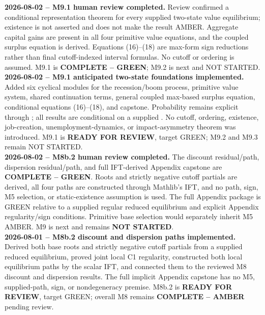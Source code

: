 \documentclass[10pt]{article}
\newcommand{\code}[1]{\texttt{\detokenize{#1}}}
\begin{document}
\textbf{2026-08-02 -- M9.1 human review completed.}
Review confirmed a conditional representation theorem for every supplied
two-state value equilibrium; existence is not asserted and does not make the
result AMBER. Aggregate capital gains are present in all four primitive value
equations, and the coupled surplus equation is derived. Equations (16)--(18)
are max-form sign reductions rather than final cutoff-indexed interval
formulas. No cutoff or ordering is assumed. M9.1 is
\textbf{COMPLETE -- GREEN}; M9.2 is next and NOT STARTED.\\[0.45em]

\textbf{2026-08-02 -- M9.1 anticipated two-state foundations implemented.}
Added six cyclical modules for the recession/boom process, primitive value
system, shared continuation terms, general coupled max-based surplus equation,
conditional equations (16)--(18), and capstone. Probability remains explicit
through \code{ShockAssumptions}; all results are conditional on a supplied
\code{TwoStateValueEquilibrium}. No cutoff, ordering, existence, job-creation,
unemployment-dynamics, or impact-asymmetry theorem was introduced. M9.1 is
\textbf{READY FOR REVIEW}, target GREEN; M9.2 and M9.3 remain NOT STARTED.\\[0.45em]

\textbf{2026-08-02 -- M8b.2 human review completed.}
The discount residual/path, dispersion residual/path, and full IFT-derived
Appendix capstone are \textbf{COMPLETE -- GREEN}. Roots and strictly negative
cutoff partials are derived, all four paths are constructed through Mathlib's
IFT, and no path, sign, M5 selection, or static-existence assumption is used.
The full Appendix package is GREEN relative to a supplied regular reduced
equilibrium and explicit Appendix regularity/sign conditions. Primitive base
selection would separately inherit M5 AMBER. M9 is next and remains
\textbf{NOT STARTED}.\\[0.45em]

\textbf{2026-08-01 -- M8b.2 discount and dispersion paths implemented.}
Derived both base roots and strictly negative cutoff partials from a supplied
reduced equilibrium, proved joint local C1 regularity, constructed both local
equilibrium paths by the scalar IFT, and connected them to the reviewed M8
discount and dispersion results. The full implicit Appendix capstone has no
M5, supplied-path, sign, or nondegeneracy premise. M8b.2 is
\textbf{READY FOR REVIEW}, target GREEN; overall M8 remains
\textbf{COMPLETE -- AMBER} pending review.\\[0.45em]
\end{document}
